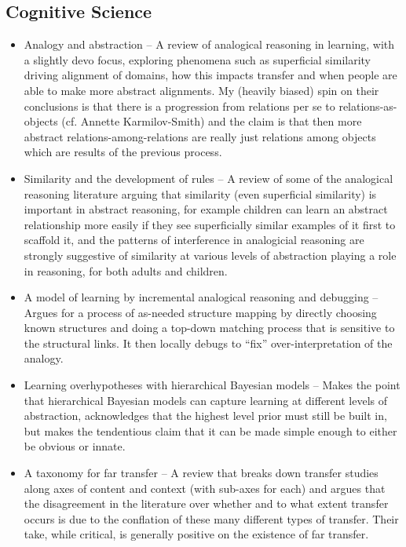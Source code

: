 \documentclass[11pt]{article}
\begin{document}
\subsection{Cognitive Science}
\begin{itemize}
\item Analogy and abstraction -- A review of analogical reasoning in learning, with a slightly devo focus, exploring phenomena such as superficial similarity driving alignment of domains, how this impacts transfer and when people are able to make more abstract alignments. My (heavily biased) spin on their conclusions is that there is a progression from relations per se to relations-as-objects (cf. Annette Karmilov-Smith) and the claim is that then more abstract relations-among-relations are really just relations among objects which are results of the previous process. \citep{Gentner2017}
\item Similarity and the development of rules -- A review of some of the analogical reasoning literature arguing that similarity (even superficial similarity) is important in abstract reasoning, for example children can learn an abstract relationship more easily if they see superficially similar examples of it first to scaffold it, and the patterns of interference in analogicial reasoning are strongly suggestive of similarity at various levels of abstraction playing a role in reasoning, for both adults and children.
\item A model of learning by incremental analogical reasoning and debugging -- Argues for a process of as-needed structure mapping by directly choosing known structures and doing a top-down matching process that is sensitive to the structural links. It then locally debugs to ``fix'' over-interpretation of the analogy. \citep{Burnstein1983}
\item Learning overhypotheses with hierarchical Bayesian models -- Makes the point that hierarchical Bayesian models can capture learning at different levels of abstraction, acknowledges that the highest level prior must still be built in, but makes the tendentious claim that it can be made simple enough to either be obvious or innate. \citep{Kemp2007}
\item A taxonomy for far transfer -- A review that breaks down transfer studies along axes of content and context (with sub-axes for each) and argues that the disagreement in the literature over whether and to what extent transfer occurs is due to the conflation of these many different types of transfer. Their take, while critical, is generally positive on the existence of far transfer. \citep{Barnett2002}

\end{itemize}
\end{document}
